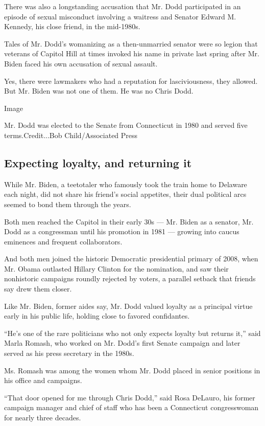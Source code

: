 There was also a longstanding accusation that Mr. Dodd participated in
an episode of sexual misconduct involving a waitress and Senator Edward
M. Kennedy, his close friend, in the mid-1980s.

Tales of Mr. Dodd's womanizing as a then-unmarried senator were so
legion that veterans of Capitol Hill at times invoked his name in
private last spring after Mr. Biden faced his own accusation of sexual
assault.

Yes, there were lawmakers who had a reputation for lasciviousness, they
allowed. But Mr. Biden was not one of them. He was no Chris Dodd.

Image

Mr. Dodd was elected to the Senate from Connecticut in 1980 and served
five terms.Credit...Bob Child/Associated Press

\hypertarget{expecting-loyalty-and-returning-it}{%
\subsection{Expecting loyalty, and returning
it}\label{expecting-loyalty-and-returning-it}}

While Mr. Biden, a teetotaler who famously took the train home to
Delaware each night, did not share his friend's social appetites, their
dual political arcs seemed to bond them through the years.

Both men reached the Capitol in their early 30s --- Mr. Biden as a
senator, Mr. Dodd as a congressman until his promotion in 1981 ---
growing into caucus eminences and frequent collaborators.

And both men joined the historic Democratic presidential primary of
2008, when Mr. Obama outlasted Hillary Clinton for the nomination, and
saw their nonhistoric campaigns roundly rejected by voters, a parallel
setback that friends say drew them closer.

Like Mr. Biden, former aides say, Mr. Dodd valued loyalty as a principal
virtue early in his public life, holding close to favored confidantes.

``He's one of the rare politicians who not only expects loyalty but
returns it,'' said Marla Romash, who worked on Mr. Dodd's first Senate
campaign and later served as his press secretary in the 1980s.

Ms. Romash was among the women whom Mr. Dodd placed in senior positions
in his office and campaigns.

``That door opened for me through Chris Dodd,'' said Rosa DeLauro, his
former campaign manager and chief of staff who has been a Connecticut
congresswoman for nearly three decades.

